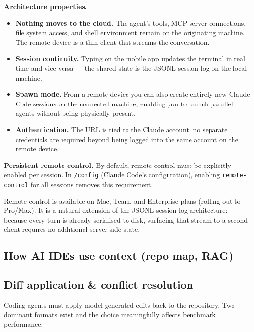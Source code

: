 \textbf{Architecture properties.}
\begin{itemize}
  \item \textbf{Nothing moves to the cloud.} The agent's tools, MCP server
    connections, file system access, and shell environment remain on the originating
    machine. The remote device is a thin client that streams the conversation.
  \item \textbf{Session continuity.} Typing on the mobile app updates the terminal
    in real time and vice versa --- the shared state is the JSONL session log on the
    local machine.
  \item \textbf{Spawn mode.} From a remote device you can also create entirely new
    Claude Code sessions on the connected machine, enabling you to launch parallel
    agents without being physically present.
  \item \textbf{Authentication.} The URL is tied to the Claude account; no
    separate credentials are required beyond being logged into the same account on
    the remote device.
\end{itemize}

\textbf{Persistent remote control.} By default, remote control must be explicitly
enabled per session. In \texttt{/config} (Claude Code's configuration), enabling
\texttt{remote-control} for all sessions removes this requirement.

\begin{notebox}
  Remote control is available on Mac, Team, and Enterprise plans (rolling out to
  Pro/Max). It is a natural extension of the JSONL session log architecture: because
  every turn is already serialised to disk, surfacing that stream to a second client
  requires no additional server-side state.
\end{notebox}

\subsection{How AI IDEs use context (repo map, RAG)}


\subsection{Diff application \& conflict resolution}

Coding agents must apply model-generated edits back to the repository. Two dominant
formats exist and the choice meaningfully affects benchmark performance:

